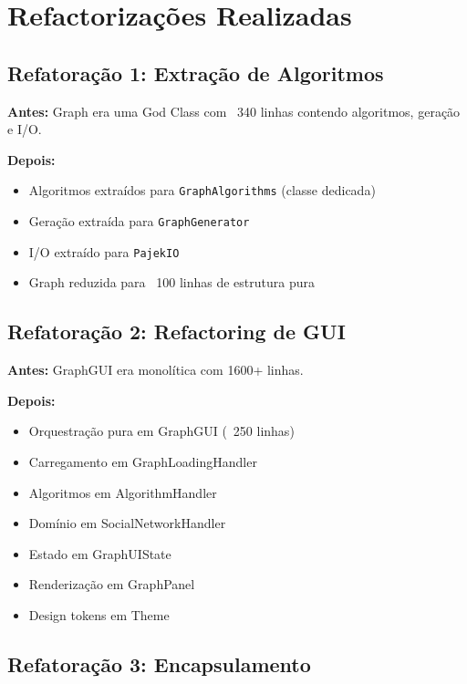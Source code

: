 \documentclass[12pt,a4paper]{article}
\begin{document}
    \newpage

    \section{Refactorizações Realizadas}

    \subsection{Refatoração 1: Extração de Algoritmos}

    \textbf{Antes:} Graph era uma God Class com ~340 linhas contendo algoritmos, geração e I/O.

    \textbf{Depois:}
    \begin{itemize}
        \item Algoritmos extraídos para \texttt{GraphAlgorithms} (classe dedicada)
        \item Geração extraída para \texttt{GraphGenerator}
        \item I/O extraído para \texttt{PajekIO}
        \item Graph reduzida para ~100 linhas de estrutura pura
    \end{itemize}

    \subsection{Refatoração 2: Refactoring de GUI}

    \textbf{Antes:} GraphGUI era monolítica com 1600+ linhas.

    \textbf{Depois:}
    \begin{itemize}
        \item Orquestração pura em GraphGUI (~250 linhas)
        \item Carregamento em GraphLoadingHandler
        \item Algoritmos em AlgorithmHandler
        \item Domínio em SocialNetworkHandler
        \item Estado em GraphUIState
        \item Renderização em GraphPanel
        \item Design tokens em Theme
    \end{itemize}

    \subsection{Refatoração 3: Encapsulamento}
\end{document}

